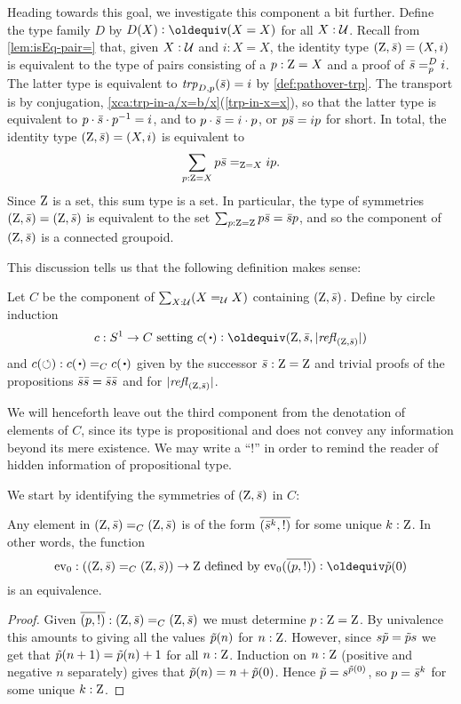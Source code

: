 Heading towards this goal, we investigate this component a bit further.
Define the type family $D$ by $D(X) \defeq (X=X)$ for all $X:\mathcal{U}$.
Recall from \cref{lem:isEq-pair=} that, given $X:\mathcal{U}$ and $i: X=X$, 
the identity type $(\mathrm{Z},\bar {s}) = (X,i)$
is equivalent to the type of pairs consisting of a $p:\mathrm{Z}=X$ and 
a proof of $\bar {s} =^{D}_{p} i$. The latter type is
equivalent to $\mathop{\mathit{trp}_{D,p}}(\bar {s}) = i$ by \cref{def:pathover-trp}.
The transport is by conjugation,
\cref{xca:trp-in-a/x=b/x}(\ref{trp-in-x=x}), so that the latter
type is equivalent to $p\cdot\bar {s}\cdot p^{-1} = i$, 
and to $p\cdot\bar {s} = i\cdot p$, or $p \bar {s} = i p$ for short. 
In total, the identity type $(\mathrm{Z},\bar {s})=(X,i)$ is equivalent to
\[
\sum_{p: {\mathrm{Z} = X}} {p \bar {s}} =_{\mathrm{Z}=X} {i p}.
\] 
Since $\mathrm{Z}$ is a set, this sum type is a set.
In particular, the type of symmetries $(\mathrm{Z},\bar {s})=(\mathrm{Z},\bar {s})$
is equivalent to the set $\sum_{p:\mathrm{Z}=\mathrm{Z}}p\bar {s}=\bar {s}p$,  
and so the component of $(\mathrm{Z},\bar {s})$ is a connected groupoid.

This discussion tells us that the following definition makes sense:

\begin{definition}\label{def:S1toC}
Let $C$ be the component of $\sum_{X:\mathcal{U}}(X=_{\mathcal{U}}X)$ containing $(\mathrm{Z},\bar {s})$.
Define by circle induction
\[
c:\Sc\to C \text{~setting~} 
c(\base)\defequi (\zet,\etop{s},\trunc{\refl{(\zet,\etop{s})}})
\]
and $c(\Sloop): c(\base)=_C c(\base)$ given by the successor 
$\bar {s}:\mathrm{Z}=\mathrm{Z}$ and trivial proofs of the propositions
$\bar {s}\bar {s}=\bar {s}\bar {s}$ and for $\lvert\mathop{{\it refl}_{(\mathrm{Z},\bar {s})}}\rvert$. 
\end{definition}

We will henceforth leave out the third component from the denotation
of elements of $C$, since its type is propositional and does not convey 
any information beyond its mere existence. We may write a ``!'' in order
to remind the reader of hidden information of propositional type.
  
We start by identifying the symmetries of $(\mathrm{Z},\bar {s})$ in $C$:

\begin{lemma}
  \label{lem:IdCisZet}
Any element in $(\mathrm{Z},\bar {s})=_C(\mathrm{Z},\bar {s})$ is of 
the form $\overline{({\bar {s}^k},{!})}$ for some unique $k:\mathrm{Z}$.  
In other words, the function 
\[
\ev_0:((\zet,\etop{s})=_C(\zet,\etop{s}))\to \zet 
\text{~defined by~} \ev_0(\pathpair{p}{!}) \defeq \ptoe{p}(0)
\]
is an equivalence.
\end{lemma}
\begin{proof}
  Given $\overline{({p},{!})}:(\mathrm{Z},\bar {s})=_C(\mathrm{Z},\bar {s})$ we must determine 
$p:\mathrm{Z}=\mathrm{Z}$. By univalence this amounts to giving all the values 
$\tilde {p}(n)$ for $n:\mathrm{Z}$.  However, since $s\tilde {p}=\tilde {p}s$ we 
get that $\tilde {p}(n+1)=\tilde {p}(n)+1$ for all $n:\mathrm{Z}$. 
Induction on $n:\mathrm{Z}$ (positive and negative $n$ separately) gives that 
$\tilde {p}(n)=n+\tilde {p}(0)$. Hence $\tilde {p}=s^{\tilde {p}(0)}$, so $p=\bar {s}^k$
for some unique $k:\mathrm{Z}$.
\end{proof}

